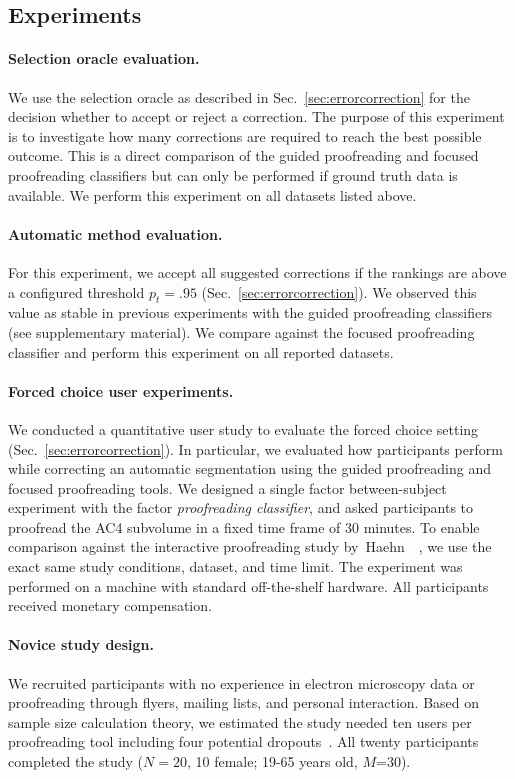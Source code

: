 \subsection{Experiments}

\paragraph{Selection oracle evaluation.} We use the selection oracle as described in Sec.~\ref{sec:errorcorrection} for the decision whether to accept or reject a correction. The purpose of this experiment is to investigate how many corrections are required to reach the best possible outcome. This is a direct comparison of the guided proofreading and focused proofreading classifiers but can only be performed if ground truth data is available. We perform this experiment on all datasets listed above.

\paragraph{Automatic method evaluation.} For this experiment, we accept all suggested corrections if the rankings are above a configured threshold $p_t=.95$ (Sec.~\ref{sec:errorcorrection}). We observed this value as stable in previous experiments with the guided proofreading classifiers (see supplementary material). We compare against the focused proofreading classifier and perform this experiment on all reported datasets.

\paragraph{Forced choice user experiments.} We conducted a quantitative user study to evaluate the forced choice setting (Sec.~\ref{sec:errorcorrection}). In particular, we evaluated how participants perform while correcting an automatic segmentation using the guided proofreading and focused proofreading tools. We designed a single factor between-subject experiment with the factor \textit{proofreading classifier}, and asked participants to proofread the AC4 subvolume in a fixed time frame of 30 minutes. To enable comparison against the interactive proofreading study by~Haehn~\etal~\cite{haehn_dojo_2014}, we use the exact same study conditions, dataset, and time limit. The experiment was performed on a machine with standard off-the-shelf hardware. All participants received monetary compensation.

\paragraph{Novice study design.} We recruited participants with no experience in electron microscopy data or proofreading through flyers, mailing lists, and personal interaction. Based on sample size calculation theory, we estimated the study needed ten users per proofreading tool including four potential dropouts~\cite{samplesize1,samplesize2}. All twenty participants completed the study ($N=20$, 10 female; 19-65 years old, $M$=30). 

